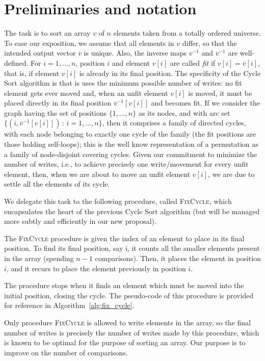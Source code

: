 
\section{Preliminaries and notation}

The task is to sort an array $v$ of $n$ elements taken from a totally ordered universe.
To ease our exposition, we assume that all elements in $v$ differ, so that the intended output vector $\overline{v}$ is unique. 
Also, the inverse maps $v^{-1}$ and $\overline{v}^{-1}$ are well-defined.
For $i=1,\dots,n$, position $i$ and element $v[i]$ are called \emph{fit} if $v[i]=\overline{v}[i]$, that is, if element $v[i]$ is already in its final position. 
The specificity of the Cycle Sort algorithm is that is uses the minimum possible number of writes: no fit element gets ever moved and, when an unfit element $v[i]$ is moved, it must be placed directly in its final position $\overline{v}^{-1}[v[i]]$ and becomes fit. If we consider the graph having the set of positions $\{1,\ldots,n\}$ as its nodes, and with arc set $\{(i,\overline{v}^{-1}[v[i]]) \, : \, i=1,\ldots, n\}$, then it comprises a family of directed cycles, with each node belonging to exactly one cycle of the family (the fit positions are those holding self-loops); this is the well know representation of a permutation as a family of node-disjoint covering cycles. Given our commitment to minimize the number of writes, i.e., to achieve precisely one write/movement for every unfit element, then, when we are about to move an unfit element $v[i]$, we are due to settle all the elements of its cycle.

We delegate this task to the following procedure, called \textsc{FixCycle}, which encapsulates the heart of the previous Cycle Sort algorithm (but will be managed more subtly and efficiently in our new proposal).

The \textsc{FixCycle} procedure is given the index of an element to place in its final position.
To find its final position, say i, it counts all the smaller
elements present in the array (spending $n-1$ comparisons).
Then, it places the element in position $i$, and it recurs to place the
element previously in position $i$.

The procedure stops when it finds an element which must be moved into the initial position, closing the cycle.
The pseudo-code of this procedure is provided for reference in Algorithm~\ref{alg:fix_cycle}.

Only procedure \textsc{FixCycle} is allowed to write elements in the array, so the final number of writes is precisely the number of writes made by this procedure, which is known to be optimal for the purpose of sorting an array.
Our purpose is to improve on the number of comparisons.


